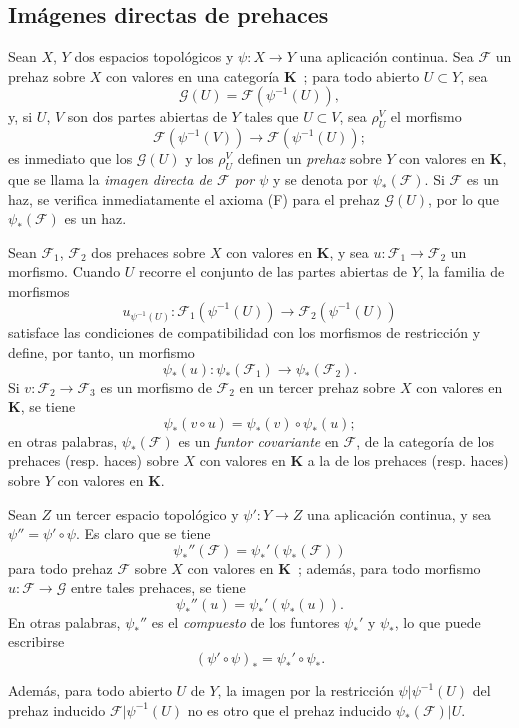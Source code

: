 \subsection{Imágenes directas de prehaces}
\label{subsection:0.3.4-fr}

\begin{env}[3.4.1]
\label{0.3.4.1-fr}
Sean $X$, $Y$ dos espacios topológicos y $\psi:X\to Y$ una aplicación
continua. Sea $\mathcal{F}$ un prehaz sobre $X$ con valores en una
categoría $\boldsymbol{K}$~; para todo abierto $U\subset Y$, sea
\[
  \mathcal{G}(U)=\mathcal{F}(\psi^{-1}(U)),
\]
y, si $U$, $V$ son dos partes abiertas de $Y$ tales que $U\subset V$, sea
$\rho_U^V$ el morfismo
\[
  \mathcal{F}(\psi^{-1}(V))\to\mathcal{F}(\psi^{-1}(U));
\]
es inmediato que los $\mathcal{G}(U)$ y los $\rho_U^V$ definen un
\emph{prehaz} sobre $Y$ con valores en $\boldsymbol{K}$, que se llama
la \emph{imagen directa de $\mathcal{F}$ por $\psi$} y se denota por
$\psi_*(\mathcal{F})$. Si $\mathcal{F}$ es un haz, se verifica inmediatamente
el axioma (F) para el prehaz $\mathcal{G}(U)$, por lo que
$\psi_*(\mathcal{F})$ es un haz.
\end{env}

\begin{env}[3.4.2]
\label{0.3.4.2-fr}
Sean $\mathcal{F}_1$, $\mathcal{F}_2$ dos prehaces sobre $X$ con valores
en $\boldsymbol{K}$, y sea $u:\mathcal{F}_1\to\mathcal{F}_2$ un morfismo.
Cuando $U$ recorre el conjunto de las partes abiertas de $Y$, la familia de
morfismos
\[
  u_{\psi^{-1}(U)}:
  \mathcal{F}_1(\psi^{-1}(U))\to\mathcal{F}_2(\psi^{-1}(U))
\]
satisface las condiciones de compatibilidad con los morfismos de restricción
y define, por tanto, un morfismo
\[
  \psi_*(u):\psi_*(\mathcal{F}_1)\to\psi_*(\mathcal{F}_2).
\]
Si $v:\mathcal{F}_2\to\mathcal{F}_3$ es un morfismo de $\mathcal{F}_2$ en
un tercer prehaz sobre $X$ con valores en $\boldsymbol{K}$, se tiene
\[
  \psi_*(v\circ u)=\psi_*(v)\circ\psi_*(u);
\]
en otras palabras, $\psi_*(\mathcal{F})$ es un \emph{funtor covariante} en
$\mathcal{F}$, de la categoría de los prehaces (resp. haces) sobre $X$ con
valores en $\boldsymbol{K}$ a la de los prehaces (resp. haces) sobre
$Y$ con valores en $\boldsymbol{K}$.
\end{env}

\begin{env}[3.4.3]
\label{0.3.4.3-fr}
Sean $Z$ un tercer espacio topológico y $\psi':Y\to Z$ una aplicación
continua, y sea $\psi''=\psi'\circ\psi$. Es claro que se tiene
\[
  \psi_*''(\mathcal{F})=\psi_*'(\psi_*(\mathcal{F}))
\]
para todo prehaz $\mathcal{F}$ sobre $X$ con valores en $\boldsymbol{K}$~; además,
para todo morfismo $u:\mathcal{F}\to\mathcal{G}$ entre tales prehaces,
se tiene
\[
  \psi_*''(u)=\psi_*'(\psi_*(u)).
\]
En otras palabras, $\psi_*''$ es el \emph{compuesto} de los funtores $\psi_*'$
y $\psi_*$, lo que puede escribirse
\[
  (\psi'\circ\psi)_*=\psi_*'\circ\psi_*.
\]

Además, para todo abierto $U$ de $Y$, la imagen por la restricción
$\psi|\psi^{-1}(U)$ del prehaz inducido
$\mathcal{F}|\psi^{-1}(U)$ no es otro que el prehaz inducido
$\psi_*(\mathcal{F})|U$.
\end{env}
